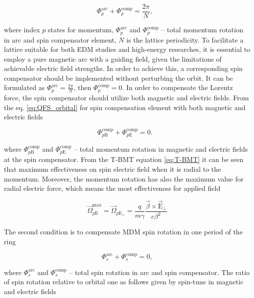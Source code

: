 \documentclass[a4paper,
               keeplastbox,   %
               ]{jacow}
\begin{document}
\begin{equation}
	\Phi_p^{\textrm{arc}}+\Phi_{p}^{\textrm{comp}}=\frac{2\pi}{N},\ \ \
	\label{eq:QFS_orbital}
\end{equation}

\noindent where index $p$ states for momentum, $\Phi_p^{\textrm{arc}}$ and $\Phi_{p}^{\textrm{comp}}$ -- total momentum rotation in arc and spin compensator element, $N$ is the lattice periodicity. To facilitate a lattice suitable for both EDM studies and high-energy researches, it is essential to employ a pure magnetic arc with a guiding field, given the limitations of achievable electric field strengths. In order to achieve this, a corresponding spin compensator should be implemented without perturbing the orbit. It can be formulated as $\Phi_p^{\textrm{arc}} = \frac{2\pi}{N}$, then $\Phi_{p}^{\textrm{comp}} = 0$. In order to compensate the Lorentz force, the spin compensator should utilize both magnetic and electric fields. From the eq. \ref{eq:QFS_orbital} for spin compensation element with both magnetic and electric fields

\begin{equation}
	\Phi_{p\textrm{B}}^{\textrm{comp}}+{\Phi}_{p\textrm{E}}^{\textrm{comp}} = 0.\ \ \ 
\end{equation}

\noindent where $\Phi_{p\textrm{B}}^{\textrm{comp}}$ and ${\Phi}_{p\textrm{E}}^{\textrm{comp}}$ -- total momentum rotation in magnetic and electric fields at the spin compensator. From the T-BMT equation \ref{eq:T-BMT} it can be seen that maximum effectiveness on spin electric field when it is radial to the momentum. Moreover, the momentum rotation has also the maximum value for radial electric force, which means the most effectiveness for applied field

\begin{equation}
	\vec{\Omega}_{p\mathrm{E}}^{\text{max}} = \vec{\Omega}_{p\mathrm{E}_{\perp}}=\frac{q}{m \gamma} \frac{\vec{\beta} \times \vec{\mathrm{E}}_{\perp}}{c \beta^2}
\end{equation}

\par The second condition is to compensate MDM spin rotation in one period of the ring 

\begin{equation}
	\Phi_s^{\textrm{arc}}+\Phi_{s}^{\textrm{comp}}=0,
	\label{eq:QFS_spin}
\end{equation}

\noindent where $\Phi_s^{\textrm{arc}}$ and $\Phi_{s}^{\textrm{comp}}$ -- total spin rotation in arc and spin compensator. The ratio of spin rotation relative to orbital one as follows given by spin-tune in magnetic and electric fields
\end{document}

